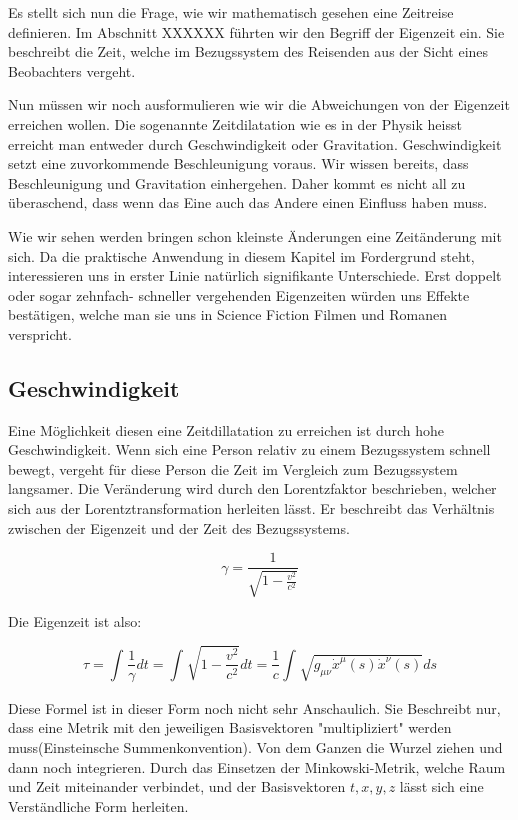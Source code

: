 \begin{refsection}
Es stellt sich nun die Frage, wie wir mathematisch gesehen eine Zeitreise definieren. Im Abschnitt XXXXXX führten wir den Begriff der Eigenzeit ein. Sie beschreibt die Zeit, welche im Bezugssystem des Reisenden aus der Sicht eines Beobachters vergeht.

Nun müssen wir noch ausformulieren wie wir die Abweichungen von der Eigenzeit erreichen wollen. Die sogenannte Zeitdilatation wie es in der Physik heisst erreicht man entweder durch Geschwindigkeit oder Gravitation. Geschwindigkeit setzt eine zuvorkommende Beschleunigung voraus. Wir wissen bereits, dass Beschleunigung und Gravitation einhergehen. Daher kommt es nicht all zu \"uberaschend, dass wenn das Eine auch das Andere einen Einfluss haben muss.

Wie wir sehen werden bringen schon kleinste \"Anderungen eine Zeitänderung mit sich. Da die praktische Anwendung in diesem Kapitel im Fordergrund steht, interessieren uns in erster Linie natürlich signifikante Unterschiede. Erst doppelt oder sogar zehnfach- schneller vergehenden Eigenzeiten w\"urden uns Effekte best\"atigen, welche man sie uns in Science Fiction Filmen und Romanen verspricht.

\subsection{Geschwindigkeit}

Eine M\"oglichkeit diesen eine Zeitdillatation zu erreichen ist durch hohe Geschwindigkeit. Wenn sich eine Person relativ zu einem Bezugssystem schnell bewegt, vergeht f\"ur diese Person die Zeit im Vergleich zum Bezugssystem langsamer. Die Ver\"anderung wird durch den Lorentzfaktor beschrieben, welcher sich aus der Lorentztransformation herleiten l\"asst. Er beschreibt das Verh\"altnis zwischen der Eigenzeit und der Zeit des Bezugssystems.

\begin{equation}
    \gamma=\frac{1}{\sqrt{1-\frac{v^2}{c^2}}} 
\end{equation}



Die Eigenzeit ist also:

\begin{equation}
    \tau
    =
    \int_{}^{}\frac{1}{\gamma}dt=\int_{}^{}\sqrt{1-\frac{v^2}{c^2}}dt
    =
    \frac{1}{c}\int_{}^{}\sqrt{g_{\mu\nu}\dot{x}^{\mu}(s)\dot{x}^{\nu}(s)}ds
\end{equation}

Diese Formel ist in dieser Form noch nicht sehr Anschaulich. Sie Beschreibt nur, dass eine Metrik mit den jeweiligen Basisvektoren "multipliziert" werden muss(Einsteinsche Summenkonvention). Von dem Ganzen die Wurzel ziehen und dann noch integrieren.
Durch das Einsetzen der Minkowski-Metrik, welche Raum und Zeit miteinander verbindet, und der Basisvektoren $t, x, y, z$ l\"asst sich eine Verst\"andliche Form herleiten. 


\end{refsection}
